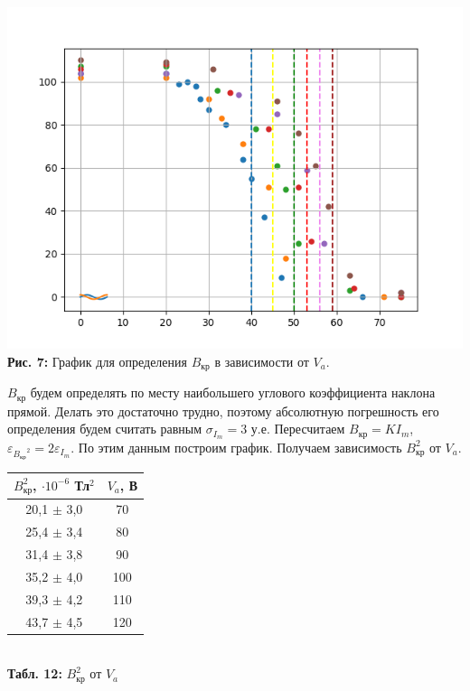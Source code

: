 \documentclass[12pt,a4paper]{scrartcl}
\begin{document}
\begin{center}
\includegraphics[scale=0.8]{PIC_7.png}\\
\textbf{Рис. 7: } График для определения $B_{\text{кр}}$ в зависимости от $V_a$.
\end{center}

$B_\text{кр}$ будем определять по месту наибольшего углового коэффициента наклона прямой. Делать это достаточно трудно, поэтому абсолютную погрешность его определения будем считать равным $\sigma_{I_m} = 3$ у.е. Пересчитаем $B_\text{кр} = KI_m$, $\varepsilon_{{B_\text{кр}}^2} = 2\varepsilon_{I_m}$. По этим данным построим график. Получаем зависимость $B_{\text{кр}}^2$ от $V_a$.

\begin{center}
\begin{tabular}{|c|c|}
\hline
$B_{\text{кр}}^2$, $\cdot 10^{-6}$ Тл$^2$ & $V_a$, В \\ \hline
20,1 $\pm$ 3,0 & 70 \\ \hline
25,4 $\pm$ 3,4 & 80 \\ \hline
31,4 $\pm$ 3,8 & 90 \\ \hline
35,2 $\pm$ 4,0 & 100 \\ \hline
39,3 $\pm$ 4,2 & 110 \\ \hline
43,7 $\pm$ 4,5 & 120 \\ \hline
\end{tabular}\\
\textbf{Табл. 12:} $B_{\text{кр}}^2$ от $V_a$
\end{center}

		\newpage
	
\end{document}

